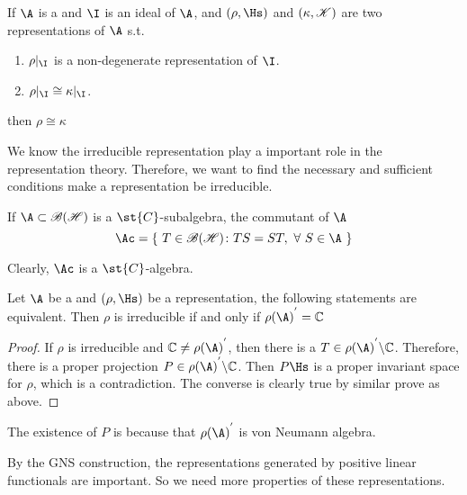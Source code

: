 \begin{cor}
	If $\A$ is a \Cs and $\I$ is an ideal of $\A$, and $(\rho,\Hs)$ and $(\kappa,\mathscr{K})$ are two representations of $\A$ s.t.
	\begin{enumerate}[label=\arabic*)]
		\item $\rho|_{\I}$ is a non-degenerate representation of $\I$.
		\item $\rho|_{\I} \cong \kappa|_{\I}$.
	\end{enumerate}
	then $\rho \cong \kappa$
\end{cor}

We know the irreducible representation play a important role in the representation theory. Therefore, we want to find the necessary and sufficient conditions make a representation be irreducible.

\begin{defn}
	If $\A \subset \oper$ is a $\st{C}$-subalgebra, the commutant of $\A$
	\begin{equation*}
		\Ac = \{~T \in \oper \colon TS=ST,~\forall~S \in \A~\}
	\end{equation*}
\end{defn}
\begin{rem}
	Clearly, $\Ac$ is a $\st{C}$-algebra.
\end{rem}

\begin{thm}
	Let $\A$ be a \Cs and $(\rho,\Hs)$ be a representation, the following statements are equivalent. Then $\rho$ is irreducible if and only if ${\rho(\A)}^{'} = \C$
\end{thm}
\begin{proof}
	If $\rho$ is irreducible and $\C \neq {\rho(\A)}^{'}$, then there is a $T \in {\rho(\A)}^{'} \backslash \C$. Therefore, there is a proper projection $P \in {\rho(\A)}^{'} \backslash \C$. Then $P\Hs$ is a proper invariant space for $\rho$, which is a contradiction. The converse is clearly true by similar prove as above.
\end{proof}
\begin{rem}
	The existence of $P$ is because that ${\rho(\A)}^{'}$ is von Neumann algebra.
\end{rem}

By the GNS construction, the representations generated by positive linear functionals are important. So we need more properties of these representations.

